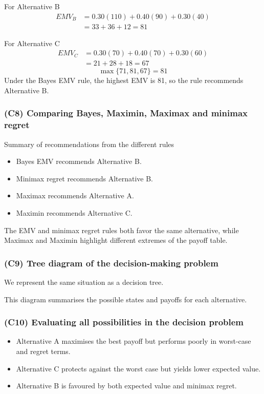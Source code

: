 For Alternative B
\[
\begin{aligned}
EMV_B &= 0.30(110) + 0.40(90) + 0.30(40) \\
&= 33 + 36 + 12 = 81
\end{aligned}
\]

For Alternative C
\[
\begin{aligned}
EMV_C &= 0.30(70) + 0.40(70) + 0.30(60) \\
&= 21 + 28 + 18 = 67
\end{aligned}
\]
\[
\max\{71, 81, 67\} = 81
\]
Under the Bayes EMV rule, the highest EMV is 81, so the rule recommends Alternative B.

\subsubsection{(C8) Comparing Bayes, Maximin, Maximax and minimax regret}\label{subsubsec:example1-1-c8}

Summary of recommendations from the different rules

\begin{itemize}
	\item Bayes EMV recommends Alternative B.
	\item Minimax regret recommends Alternative B.
	\item Maximax recommends Alternative A.
	\item Maximin recommends Alternative C.
\end{itemize}

The EMV and minimax regret rules both favor the same alternative, while Maximax and Maximin highlight different extremes of the payoff table.

\subsubsection{(C9) Tree diagram of the decision-making problem}\label{subsubsec:example1-1-c9}

We represent the same situation as a decision tree.

This diagram summarises the possible states and payoffs for each alternative.

\subsubsection{(C10) Evaluating all possibilities in the decision problem}\label{subsubsec:example1-1-c10}

\begin{itemize}
	\item Alternative A maximises the best payoff but performs poorly in worst-case and regret terms.
	\item Alternative C protects against the worst case but yields lower expected value.
	\item Alternative B is favoured by both expected value and minimax regret.
\end{itemize}

